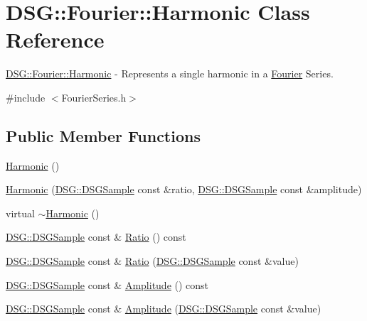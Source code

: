 \hypertarget{class_d_s_g_1_1_fourier_1_1_harmonic}{\section{D\+S\+G\+:\+:Fourier\+:\+:Harmonic Class Reference}
\label{class_d_s_g_1_1_fourier_1_1_harmonic}
}


\hyperlink{class_d_s_g_1_1_fourier_1_1_harmonic}{D\+S\+G\+::\+Fourier\+::\+Harmonic} -\/ Represents a single harmonic in a \hyperlink{namespace_d_s_g_1_1_fourier}{Fourier} Series.  




{\ttfamily \#include $<$Fourier\+Series.\+h$>$}

\subsection*{Public Member Functions}
\begin{DoxyCompactItemize}
\item 
\hyperlink{class_d_s_g_1_1_fourier_1_1_harmonic_a5433617eaac39402d27ce24634140940}{Harmonic} ()
\item 
\hyperlink{class_d_s_g_1_1_fourier_1_1_harmonic_a1dbca63f18e7271f78ad466bacdad394}{Harmonic} (\hyperlink{namespace_d_s_g_ac39a94cd27ebcd9c1e7502d0c624894a}{D\+S\+G\+::\+D\+S\+G\+Sample} const \&ratio, \hyperlink{namespace_d_s_g_ac39a94cd27ebcd9c1e7502d0c624894a}{D\+S\+G\+::\+D\+S\+G\+Sample} const \&amplitude)
\item 
virtual \hyperlink{class_d_s_g_1_1_fourier_1_1_harmonic_aad4e5d3e4ef8cd53bf01b0624246b826}{$\sim$\+Harmonic} ()
\item 
\hyperlink{namespace_d_s_g_ac39a94cd27ebcd9c1e7502d0c624894a}{D\+S\+G\+::\+D\+S\+G\+Sample} const \& \hyperlink{class_d_s_g_1_1_fourier_1_1_harmonic_a26b2ccbb2f25f72040a555c51dc43672}{Ratio} () const 
\item 
\hyperlink{namespace_d_s_g_ac39a94cd27ebcd9c1e7502d0c624894a}{D\+S\+G\+::\+D\+S\+G\+Sample} const \& \hyperlink{class_d_s_g_1_1_fourier_1_1_harmonic_a013dc7cae9bd09dbc26193f5b501776f}{Ratio} (\hyperlink{namespace_d_s_g_ac39a94cd27ebcd9c1e7502d0c624894a}{D\+S\+G\+::\+D\+S\+G\+Sample} const \&value)
\item 
\hyperlink{namespace_d_s_g_ac39a94cd27ebcd9c1e7502d0c624894a}{D\+S\+G\+::\+D\+S\+G\+Sample} const \& \hyperlink{class_d_s_g_1_1_fourier_1_1_harmonic_a99175479a12ca8b6103eb58179777775}{Amplitude} () const 
\item 
\hyperlink{namespace_d_s_g_ac39a94cd27ebcd9c1e7502d0c624894a}{D\+S\+G\+::\+D\+S\+G\+Sample} const \& \hyperlink{class_d_s_g_1_1_fourier_1_1_harmonic_ae94f1868dfe70a1ea90cb86a5cc31a15}{Amplitude} (\hyperlink{namespace_d_s_g_ac39a94cd27ebcd9c1e7502d0c624894a}{D\+S\+G\+::\+D\+S\+G\+Sample} const \&value)
\end{DoxyCompactItemize}
